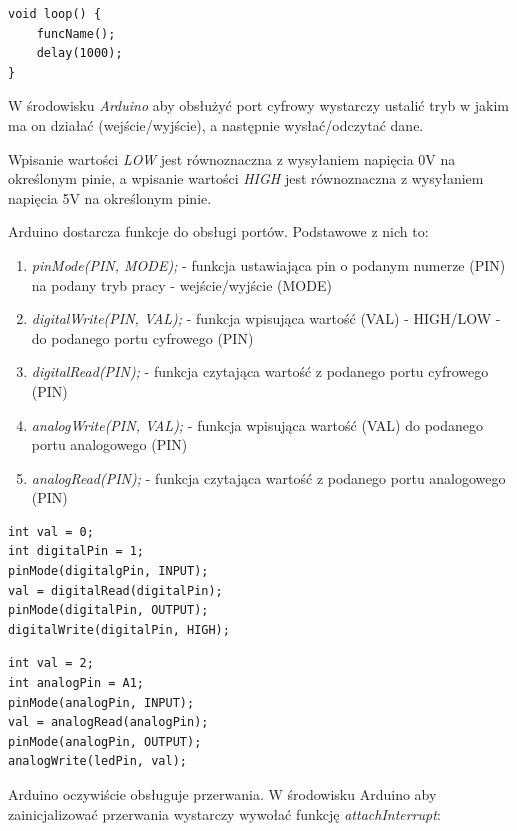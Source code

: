 \documentclass{xmgr}
\begin{document}
\begin{lstlisting}[label=bot-dirs-alg,caption=Odpytywanie funkcji w nieskończonej pętli w środowisku Arduino]
void loop() {
	funcName();
	delay(1000);
}
\end{lstlisting}

W środowisku \emph{Arduino} aby obsłużyć port cyfrowy wystarczy ustalić tryb w jakim ma on działać (wejście/wyjście), a następnie wysłać/odczytać dane.

Wpisanie wartości \emph{LOW} jest równoznaczna z wysyłaniem napięcia 0V na określonym pinie, a wpisanie wartości \emph{HIGH} jest równoznaczna z wysyłaniem napięcia 5V na określonym pinie.

Arduino dostarcza funkcje do obsługi portów. Podstawowe z nich to:

\begin{enumerate}
	\item \emph{pinMode(PIN, MODE);} - funkcja ustawiająca pin o podanym numerze (PIN) na podany tryb pracy - wejście/wyjście (MODE)
	\item \emph{digitalWrite(PIN, VAL);} - funkcja wpisująca wartość (VAL) - HIGH/LOW - do podanego portu cyfrowego (PIN)
	\item \emph{digitalRead(PIN);} - funkcja czytająca wartość z podanego portu cyfrowego (PIN)
	\item \emph{analogWrite(PIN, VAL);} - funkcja wpisująca wartość (VAL) do podanego portu analogowego (PIN)
	\item \emph{analogRead(PIN);}  - funkcja czytająca wartość z podanego portu analogowego (PIN)
\end{enumerate}

\begin{lstlisting}[label=bot-dirs-alg,caption=Obsługa portu cyfrowego w środowisku Arduino]
int val = 0;
int digitalPin = 1;	
pinMode(digitalgPin, INPUT);
val = digitalRead(digitalPin);
pinMode(digitalPin, OUTPUT);
digitalWrite(digitalPin, HIGH);
\end{lstlisting}

\begin{lstlisting}[label=bot-dirs-alg,caption=Obsługa portu analogowego w środowisku Arduino]
int val = 2;
int analogPin = A1;	
pinMode(analogPin, INPUT);
val = analogRead(analogPin);
pinMode(analogPin, OUTPUT);
analogWrite(ledPin, val);
\end{lstlisting}

Arduino oczywiście obsługuje przerwania. W środowisku Arduino aby zainicjalizować przerwania wystarczy wywołać funkcję \emph{attachInterrupt}:
\end{document}
